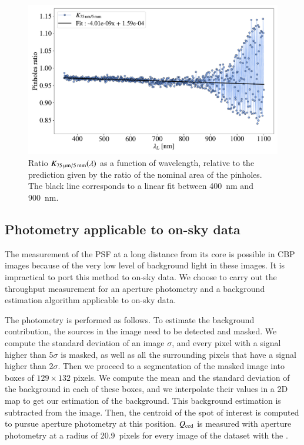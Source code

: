 \begin{figure}[h]
    \centering
    \includegraphics[width=\columnwidth]{fig/ratio_pinholes.pdf}
    \caption{Ratio $K_\mathrm{\SI{75}{\micro\meter}/\SI{5}{\milli\meter}}(\lambda)$ as a function of wavelength, relative to the prediction given by the ratio of the nominal area of the pinholes. The black line corresponds to a linear fit between \SI{400}{\nm} and \SI{900}{\nm}.}
    \label{fig:ratio_pinholes}
\end{figure}


\subsection{Photometry applicable to on-sky data}
\label{sec:photometry_small}

The measurement of the PSF at a long distance from its core is possible in CBP images because of the very low level of background light in these images. It is impractical to port this method to on-sky data. We choose to carry out the throughput measurement for an aperture photometry and a background estimation algorithm applicable to on-sky data. 

The photometry is performed as follows. To estimate the background contribution, the sources in the image need to be detected and masked. We compute the standard deviation of an image $\sigma$, and every pixel with a signal higher than 5$\sigma$ is masked, as well as all the surrounding pixels that have a signal higher than 2$\sigma$. Then we proceed to a segmentation of the masked image into boxes of $129\times132$ pixels. We compute the mean and the standard deviation of the background in each of these boxes, and we interpolate their values in a 2D map to get our estimation of the background. This background estimation is subtracted from the image. Then, the centroid of the spot of interest is computed to pursue aperture photometry at this position. $Q_{\mathrm{ccd}}$ is measured with aperture photometry at a radius of \SI{20.9}{pixels} for every image of the dataset with the \spinhole.

